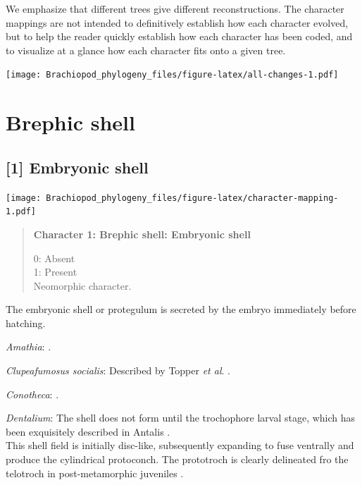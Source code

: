 \documentclass[openany]{book}
\begin{document}
We emphasize that different trees give different reconstructions. The
character mappings are not intended to definitively establish how each
character evolved, but to help the reader quickly establish how each
character has been coded, and to visualize at a glance how each
character fits onto a given tree.







\texttt{[image: Brachiopod\_phylogeny\_files/figure-latex/all-changes-1.pdf]}

\section{Brephic shell}\label{brephic-shell}

\subsection*{{[}1{]} Embryonic shell}\label{embryonic-shell}

\texttt{[image: Brachiopod\_phylogeny\_files/figure-latex/character-mapping-1.pdf]}

\begin{quote}
\textbf{Character 1: Brephic shell: Embryonic shell}

0: Absent\\
1: Present\\
Neomorphic character.
\end{quote}

The embryonic shell or protegulum is secreted by the embryo immediately
before hatching.

\hypertarget{Amathia-coding-1}{}
\emph{Amathia}: \citet{Reed1982}.

\hypertarget{Clupeafumosus_socialis-coding-1}{}
\emph{Clupeafumosus socialis}: Described by Topper \emph{et al}.
\citeyearpar{Topper2013Reappraisalof}.

\hypertarget{Conotheca-coding-1}{}
\emph{Conotheca}: \citep{Wrona2003}.

\hypertarget{Dentalium-coding-1}{}
\emph{Dentalium}: The shell does not form until the trochophore larval
stage, which has been exquisitely described in Antalis
\citep{Wanninger2001}.\\
This shell field is initially disc-like, subsequently expanding to fuse
ventrally and produce the cylindrical protoconch. The prototroch is
clearly delineated fro the telotroch in post-metamorphic juveniles
\citep{Wanninger2001}.
\end{document}
